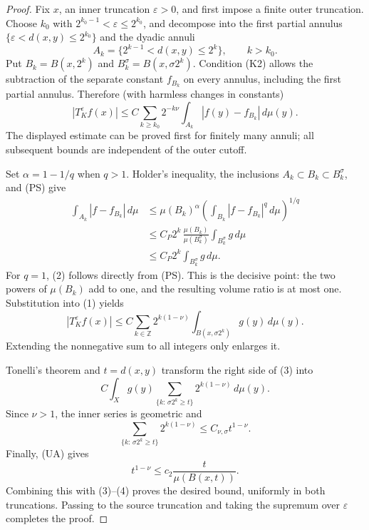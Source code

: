 \documentclass[11pt]{article}
\begin{document}
\begin{proof}
Fix \(x\), an inner truncation \(\varepsilon>0\), and first impose a finite
outer truncation.  Choose \(k_0\) with
\(2^{k_0-1}<\varepsilon\le2^{k_0}\), and decompose into the first partial
annulus \(\{\varepsilon<d(x,y)\le2^{k_0}\}\) and the dyadic annuli
\[
 A_k=\{2^{k-1}<d(x,y)\le2^k\},\qquad k>k_0.
\]
Put \(B_k=B(x,2^k)\) and \(B_k^\sigma=B(x,\sigma2^k)\).  Condition (K2)
allows the subtraction of the separate constant \(f_{B_k}\) on every
annulus, including the first partial annulus.  Therefore (with harmless
changes in constants)
\begin{equation}
 |T_{K}^{\varepsilon}f(x)|
 \le C\sum_{k\ge k_0}2^{-k\nu}
       \int_{A_k}|f(y)-f_{B_k}|\,d\mu(y).                              \tag{1}
\end{equation}
The displayed estimate can be proved first for finitely many annuli; all
subsequent bounds are independent of the outer cutoff.

Set \(\alpha=1-1/q\) when \(q>1\).  Holder's inequality, the inclusions
\(A_k\subset B_k\subset B_k^\sigma\), and (PS) give
\begin{align*}
 \int_{A_k}|f-f_{B_k}|\,d\mu
 &\le \mu(B_k)^\alpha
       \left(\int_{B_k}|f-f_{B_k}|^q\,d\mu\right)^{1/q}\\
 &\le C_P2^k\,
       \frac{\mu(B_k)}{\mu(B_k^\sigma)}
       \int_{B_k^\sigma}g\,d\mu\\
 &\le C_P2^k\int_{B_k^\sigma}g\,d\mu .                              \tag{2}
\end{align*}
For \(q=1\), (2) follows directly from (PS).  This is the decisive point:
the two powers of \(\mu(B_k)\) add to one, and the resulting volume ratio is
at most one.  Substitution into (1) yields
\begin{equation}
 |T_{K}^{\varepsilon}f(x)|
 \le C\sum_{k\in\mathbb Z}2^{k(1-\nu)}
                 \int_{B(x,\sigma2^k)}g(y)\,d\mu(y).                  \tag{3}
\end{equation}
Extending the nonnegative sum to all integers only enlarges it.

Tonelli's theorem and \(t=d(x,y)\) transform the right side of (3) into
\[
 C\int_X g(y)
   \sum_{\{k:\,\sigma2^k\ge t\}}2^{k(1-\nu)}\,d\mu(y).
\]
Since \(\nu>1\), the inner series is geometric and
\begin{equation}
  \sum_{\{k:\,\sigma2^k\ge t\}}2^{k(1-\nu)}
  \le C_{\nu,\sigma}t^{1-\nu}.                                      \tag{4}
\end{equation}
Finally, (UA) gives
\[
 t^{1-\nu}\le c_2\frac{t}{\mu(B(x,t))}.
\]
Combining this with (3)--(4) proves the desired bound, uniformly in both
truncations.  Passing to the source truncation and taking the supremum over
\(\varepsilon\) completes the proof.
\end{proof}
\end{document}
